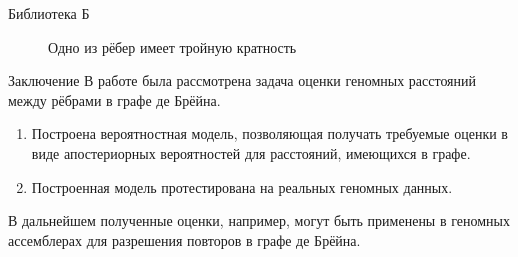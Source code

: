 \documentclass[unicode, notheorems]{beamer}
\begin{document}
\begin{frame}{Библиотека Б}
\begin{figure}%
	\centering
	\qquad
	\caption{Одно из рёбер имеет тройную кратность}
\end{figure}
\end{frame}

\begin{frame}{Заключение}
	В работе была рассмотрена задача оценки геномных расстояний между рёбрами в графе де Брёйна.
	\bigskip
	\begin{enumerate}
		\item Построена вероятностная модель, позволяющая получать требуемые оценки в виде апостериорных вероятностей для расстояний, имеющихся в графе.
		\item Построенная модель протестирована на реальных геномных данных.
	\end{enumerate}
	\bigskip
	В дальнейшем полученные оценки, например, могут быть применены в геномных ассемблерах для разрешения повторов в графе де Брёйна. 
\end{frame}
\end{document}

